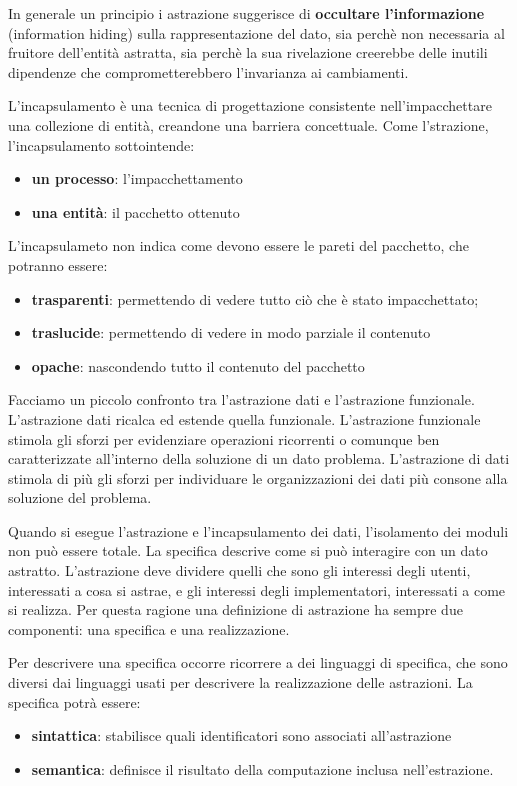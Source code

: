 \documentclass[a4paper,18pt]{extarticle}
\begin{document}
In generale un principio i astrazione suggerisce di \textbf{occultare l'informazione} (information hiding) sulla rappresentazione del dato, sia perchè non necessaria al fruitore dell'entità astratta, sia perchè la sua rivelazione creerebbe delle inutili dipendenze che comprometterebbero l'invarianza ai cambiamenti. 

L'incapsulamento è una tecnica di progettazione consistente nell'impacchettare una collezione di entità, creandone una barriera concettuale. Come l'strazione, l'incapsulamento sottointende:

\begin{itemize}
  \item \textbf{un processo}: l'impacchettamento
  \item \textbf{una entità}: il pacchetto ottenuto
\end{itemize}

L'incapsulameto non indica come devono essere le pareti del pacchetto, che potranno essere:
\begin{itemize}
  \item \textbf{trasparenti}: permettendo di vedere tutto ciò che è stato impacchettato;
  \item \textbf{traslucide}: permettendo di vedere in modo parziale il contenuto
  \item \textbf{opache}: nascondendo tutto il contenuto del pacchetto
\end{itemize}

Facciamo un piccolo confronto tra l'astrazione dati e l'astrazione funzionale. L'astrazione dati ricalca ed estende quella funzionale. L'astrazione funzionale stimola gli sforzi per evidenziare operazioni ricorrenti o comunque ben caratterizzate all'interno della soluzione di un dato problema. L'astrazione di dati stimola di più gli sforzi per individuare le organizzazioni dei dati più consone alla soluzione del problema.

Quando si esegue l'astrazione e l'incapsulamento dei dati, l'isolamento dei moduli non può essere totale. La specifica descrive come si può interagire con un dato astratto. L'astrazione deve dividere quelli che sono gli interessi degli utenti, interessati a cosa si astrae, e gli interessi degli implementatori, interessati a come si realizza. Per questa ragione una definizione di astrazione ha sempre due componenti: una specifica e una realizzazione.

Per descrivere una specifica occorre ricorrere a dei linguaggi di specifica, che sono diversi dai linguaggi usati per descrivere la realizzazione delle astrazioni. La specifica potrà essere:
\begin{itemize}
  \item \textbf{sintattica}: stabilisce quali identificatori sono associati all'astrazione
  \item \textbf{semantica}: definisce il risultato della computazione inclusa nell'estrazione.
\end{itemize}
\end{document}
